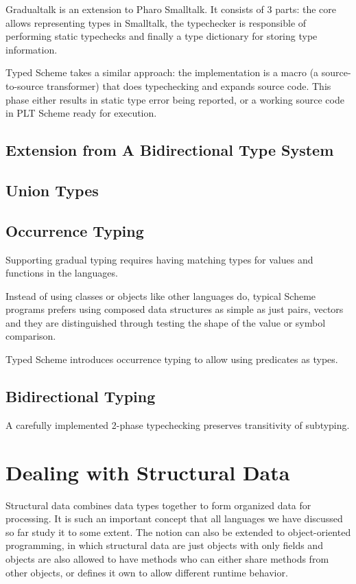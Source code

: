 Gradualtalk is an extension to Pharo Smalltalk. It consists of 3 parts:
the core allows representing types in Smalltalk, the typechecker
is responsible of performing static typechecks and finally
a type dictionary for storing type information.

Typed Scheme takes a similar approach: the implementation is a macro
(a source-to-source transformer) that does typechecking and expands source code.
This phase either results in static type error being reported,
or a working source code in PLT Scheme ready for execution.

\subsection{Extension from A Bidirectional Type System}

\subsection{Union Types}

\subsection{Occurrence Typing}

Supporting gradual typing requires having matching types for values and functions in the languages.

Instead of using classes or objects like other languages do,
typical Scheme programs prefers using composed data structures as simple as just pairs, vectors
and they are distinguished through testing the shape of the value or
symbol comparison.

Typed Scheme introduces occurrence typing to allow using predicates as types.

\subsection{Bidirectional Typing}

A carefully implemented 2-phase typechecking preserves transitivity of subtyping.

\section{Dealing with Structural Data}

Structural data combines data types together to form organized data for processing.
It is such an important concept that all languages we have discussed so far study
it to some extent. The notion can also be extended to object-oriented programming,
in which structural data are just objects with only fields and objects are also
allowed to have methods who can either share methods from other objects,
or defines it own to allow different runtime behavior.


